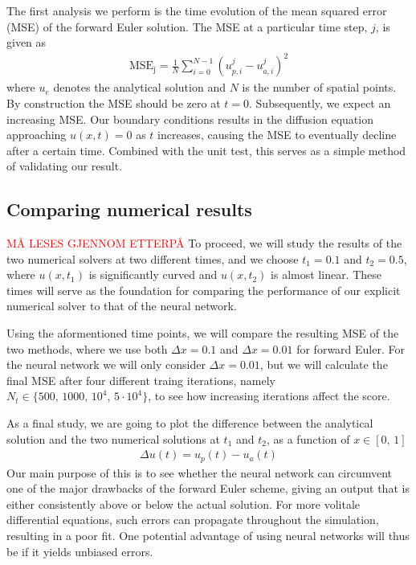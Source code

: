 \documentclass[12pt]{extarticle}
\begin{document}
The first analysis we perform is the time evolution of the mean squared error (MSE) of the forward Euler solution. The MSE at a particular time step, $j$, is given as 
\begin{align} \label{eq:MSE}
	\mathrm{MSE_j} = \frac{1}{N}\sum_{i=0}^{N-1} (u_{p,i}^j - u_{a,i}^j)^2 
\end{align}
where $u_e$ denotes the analytical solution and $N$ is the number of spatial points. By construction the MSE should be zero at $t=0$. Subsequently, we expect an increasing MSE. Our boundary conditions results in the diffusion equation approaching $u(x,t)=0$ as $t$ increases, causing the MSE to eventually decline after a certain time. Combined with the unit test, this serves as a simple method of validating our result.  


\subsection{Comparing numerical results}
\textcolor{red}{MÅ LESES GJENNOM ETTERPÅ}
To proceed, we will study the results of the two numerical solvers at two different times, and we choose $t_1=0.1$ and $t_2=0.5$, where $u(x,t_1)$ is significantly curved and $u(x,t_2)$ is almost linear. These times will serve as the foundation for comparing the performance of our explicit numerical solver to that of the neural network. 

Using the aformentioned time points, we will compare the resulting MSE of the two methods, where we use both $\Delta x = 0.1$ and $\Delta x = 0.01$ for forward Euler. For the neural network we will only consider $\Delta x = 0.01$, but we will calculate the final MSE after four different traing iterations, namely $N_t\in\{500,\,1000,\,10^4,\,5\cdot10^4\}$, to see how increasing iterations affect the score.   

As a final study, we are going to plot the difference between the analytical solution and the two numerical solutions at $t_1$ and $t_2$, as a function of $x\in[0,\,1]$ 
\begin{align} \label{eq:absolute_difference}
	\Delta u(t) = u_{p}(t) - u_{a}(t)
\end{align}
Our main purpose of this is to see whether the neural network can circumvent one of the major drawbacks of the forward Euler scheme, giving an output that is either consistently above or below the actual solution. For more volitale differential equations, such errors can propagate throughout the simulation, resulting in a poor fit. One potential advantage of using neural networks will thus be if it yields unbiased errors. 
\end{document}
